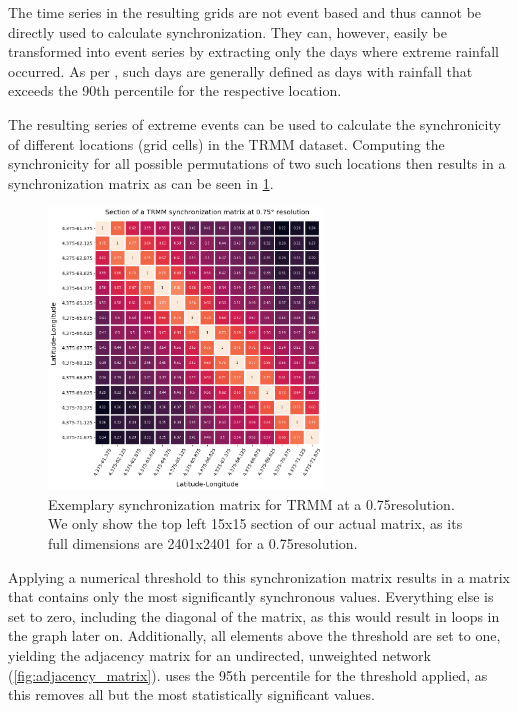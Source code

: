 The time series in the resulting grids are not event based and thus cannot be directly used to calculate synchronization. They can, however, easily be transformed into event series by extracting only the days where extreme rainfall occurred. As per \citet{Stolbova.2015}, such days are generally defined as days with rainfall that exceeds the 90th percentile for the respective location.

The resulting series of extreme events can be used to calculate the synchronicity of different locations (grid cells) in the TRMM dataset. Computing the synchronicity for all possible permutations of two such locations then results in a synchronization matrix as can be seen in \cref{fig:synchronization_matrix}.

\begin{figure}[h]
  \centering
  \includegraphics[width=0.65\textwidth]{./99_appendix/img/trmm_sync_example}
  \caption{Exemplary synchronization matrix for TRMM at a 0.75\degree resolution. We only show the top left 15x15 section of our actual matrix, as its full dimensions are 2401x2401 for a 0.75\degree resolution.}
  \label{fig:synchronization_matrix}
\end{figure}

Applying a numerical threshold to this synchronization matrix results in a matrix that contains only the most significantly synchronous values. Everything else is set to zero, including the diagonal of the matrix, as this would result in loops in the graph later on. Additionally, all elements above the threshold are set to one, yielding the adjacency matrix for an undirected, unweighted network (\cref{fig:adjacency_matrix}). \citet{Stolbova.2015} uses the 95th percentile for the threshold applied, as this removes all but the most statistically significant values.

